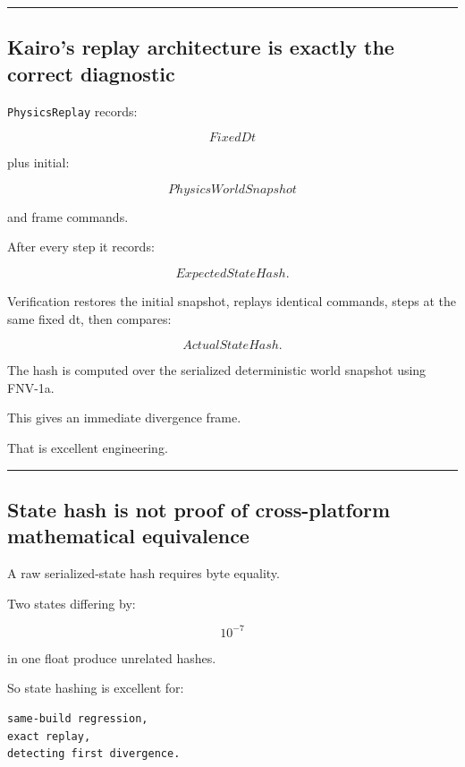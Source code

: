 \begin{center}\rule{0.5\linewidth}{0.5pt}\end{center}

\subsection{Kairo's replay architecture is exactly the correct diagnostic}\label{06-engine-ii-ch039-kairos-replay-architecture-is-exactly-the-correct-diagnostic}

\texttt{PhysicsReplay} records:

\[
FixedDt
\]

plus initial:

\[
PhysicsWorldSnapshot
\]

and frame commands.

After every step it records:

\[
ExpectedStateHash.
\]

Verification restores the initial snapshot, replays identical commands, steps at the same fixed dt, then compares:

\[
ActualStateHash.
\]

The hash is computed over the serialized deterministic world snapshot using FNV-1a.

This gives an immediate divergence frame.

That is excellent engineering.

\begin{center}\rule{0.5\linewidth}{0.5pt}\end{center}

\subsection{State hash is not proof of cross-platform mathematical equivalence}\label{06-engine-ii-ch039-state-hash-is-not-proof-of-cross-platform-mathematical-equivalence}

A raw serialized-state hash requires byte equality.

Two states differing by:

\[
10^{-7}
\]

in one float produce unrelated hashes.

So state hashing is excellent for:

\begin{verbatim}
same-build regression,
exact replay,
detecting first divergence.
\end{verbatim}

